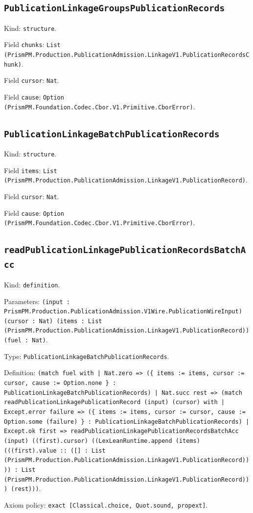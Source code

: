 \documentclass[11pt]{article}
\begin{document}
\subsection*{\texttt{PublicationLinkageGroupsPublicationRecords}}
\noindent Kind: \texttt{structure}.\par
\noindent Field \texttt{chunks}: \texttt{List (PrismPM.Production.PublicationAdmission.LinkageV1.PublicationRecordsChunk)}.\par
\noindent Field \texttt{cursor}: \texttt{Nat}.\par
\noindent Field \texttt{cause}: \texttt{Option (PrismPM.Foundation.Codec.Cbor.V1.Primitive.CborError)}.\par
\subsection*{\texttt{PublicationLinkageBatchPublicationRecords}}
\noindent Kind: \texttt{structure}.\par
\noindent Field \texttt{items}: \texttt{List (PrismPM.Production.PublicationAdmission.LinkageV1.PublicationRecord)}.\par
\noindent Field \texttt{cursor}: \texttt{Nat}.\par
\noindent Field \texttt{cause}: \texttt{Option (PrismPM.Foundation.Codec.Cbor.V1.Primitive.CborError)}.\par
\subsection*{\texttt{readPublicationLinkagePublicationRecordsBatchAcc}}
\noindent Kind: \texttt{definition}.\par
\noindent Parameters: \texttt{(input : PrismPM.Production.PublicationAdmission.V1Wire.PublicationWireInput) (cursor : Nat) (items : List (PrismPM.Production.PublicationAdmission.LinkageV1.PublicationRecord)) (fuel : Nat)}.\par
\noindent Type: \texttt{PublicationLinkageBatchPublicationRecords}.\par
\noindent Definition: \texttt{(match fuel with | Nat.zero => (\{ items := items, cursor := cursor, cause := Option.none \} : PublicationLinkageBatchPublicationRecords) | Nat.succ rest => (match readPublicationLinkagePublicationRecord (input) (cursor) with | Except.error failure => (\{ items := items, cursor := cursor, cause := Option.some (failure) \} : PublicationLinkageBatchPublicationRecords) | Except.ok first => readPublicationLinkagePublicationRecordsBatchAcc (input) ((first).cursor) ((LexLeanRuntime.append (items) (((first).value :: ([] : List (PrismPM.Production.PublicationAdmission.LinkageV1.PublicationRecord)))) : List (PrismPM.Production.PublicationAdmission.LinkageV1.PublicationRecord))) (rest)))}.\par
\noindent Axiom policy: \texttt{exact [Classical.choice, Quot.sound, propext]}.\par
\end{document}
